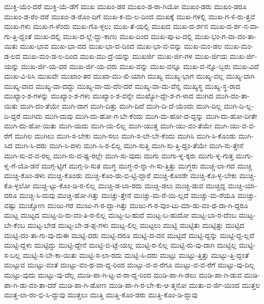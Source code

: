 {ಮುಕ್ತಿ-ಯೆಂ-ದರೆ
ಮುಕ್ತಿ-ಯೆ-ಡೆಗೆ
ಮುಖ
ಮುಖಂ-ಡರ
ಮುಖಂ-ಡ-ರಾ-ಗಿಯೋ
ಮುಖಂ-ಡರು
ಮುಖಂ-ಡರೂ
ಮುಖಂ-ಡ-ರೆಂ-ದರೆ
ಮುಖಂ-ಡ-ರೊಂ-ದಿಗೆ
ಮುಖ-ಕ-ಮ-ಲ-ದಿಂದ
ಮುಖಕ್ಕೆ
ಮುಖ-ಗಳಲ್ಲಿ
ಮುಖ-ಗ-ಳಿ-ರು-ತ್ತವೆ
ಮುಖ-ಗಳು
ಮುಖ-ಗ-ಳೆಂದು
ಮುಖ-ಗೊ-ಳ್ಳಲು
ಮುಖ-ತೆ-ಯಲ್ಲಿ
ಮುಖದ
ಮುಖ-ದ-ರ್ಶನ
ಮುಖ-ದ-ರ್ಶ-ನ-ವಾ-ಗು-ತ್ತಿ-ದ್ದಂತೆ
ಮುಖ-ದಲ್ಲಿ
ಮುಖ-ದ-ಲ್ಲೆ-ದ್ದು-ಕಾಣು
ಮುಖ-ದಿಂದ
ಮುಖ-ಪು-ಟ-ದಲ್ಲಿ
ಮುಖ-ಭಂ-ಗ-ವಾ-ದಂ-ತಾ-ಯಿತು
ಮುಖ-ಭಾವ
ಮುಖ-ಭಾ-ವದ
ಮುಖ-ಭಾ-ವ-ದಿಂದ
ಮುಖ-ಭಾ-ವ-ವನ್ನು
ಮುಖ-ಮಂ-ಡಲ
ಮುಖ-ಮಂ-ಡ-ಲದ
ಮುಖ-ಮಂ-ಡ-ಲ-ದಿಂದ
ಮುಖ-ಮು-ದ್ರೆ-ಯನ್ನು
ಮುಖರ್ಜಿ
ಮುಖ-ರ್ಜಿ-ಗಳ
ಮುಖ-ರ್ಜಿಯ
ಮುಖ-ರ್ಜಿ-ಯನ್ನು
ಮುಖ-ರ್ಜಿ-ಯ-ವರ
ಮುಖ-ರ್ಜಿ-ಯ-ವರು
ಮುಖ-ವನ್ನು
ಮುಖ-ವನ್ನೂ
ಮುಖ-ವ-ನ್ನೊ-ಬ್ಬರು
ಮುಖ-ವಿದೆ
ಮುಖ-ವಿ-ರಿಸಿ
ಮುಖವೇ
ಮುಖಾಂ-ತರ
ಮುಖಾ-ಮು-ಖಿ-ಯಾಗಿ
ಮುಖ್ಯ
ಮುಖ್ಯ-ಭಾಗ
ಮುಖ್ಯ-ವಲ್ಲ
ಮುಖ್ಯ-ವಾಗಿ
ಮುಖ್ಯ-ವಾದ
ಮುಖ್ಯ-ವಾ-ದದ್ದು
ಮುಖ್ಯ-ವಾ-ದು-ದೆಂ-ದರೆ
ಮುಖ್ಯ-ವಾ-ದು-ವೆನ್ನ
ಮುಖ್ಯಸ್ಥ
ಮುಖ್ಯ-ಸ್ಥ-ರಾದ
ಮುಖ್ಯಾಂ-ಶ-ಗಳನ್ನು
ಮುಖ್ಯಾಂ-ಶ-ಗಳು
ಮುಖ್ಯಾಂ-ಶ-ವನ್ನೇ
ಮುಖ್ಯೋ-ದ್ದೇ-ಶ-ಗ-ಳಾದ
ಮುಗಿದ
ಮುಗಿ-ದಂ-ತಾ-ಯಿತು
ಮುಗಿ-ದಂ-ತೆಯೇ
ಮುಗಿ-ದಾಗ
ಮುಗಿ-ದಿತ್ತು
ಮುಗಿ-ದಿದೆ
ಮುಗಿ-ದಿ-ದೆ-ಯೆಂದು
ಮುಗಿ-ದಿಲ್ಲ
ಮುಗಿ-ದಿ-ಲ್ಲ-ದಿ-ದ್ದರೆ
ಮುಗಿದು
ಮುಗಿ-ದುವು
ಮುಗಿ-ದು-ಹೋ-ಗ-ಬೇ-ಕೆಂದು
ಮುಗಿ-ದು-ಹೋ-ದ-ದ್ದನ್ನು
ಮುಗಿ-ದು-ಹೋ-ದೀತೇ
ಮುಗಿ-ದು-ಹೋ-ಯಿತು
ಮುಗಿ-ಯದು
ಮುಗಿ-ಯ-ಲಿಲ್ಲ
ಮುಗಿ-ಯುತ್ತ
ಮುಗಿ-ಯು-ವಂ-ತೆಯೇ
ಮುಗಿ-ಯು-ವ-ವ-ರೆಗೆ
ಮುಗಿಲ
ಮುಗಿಲು
ಮುಗಿ-ಸ-ಬೇಕು
ಮುಗಿ-ಸಲು
ಮುಗಿ-ಸ-ಲೇ-ಬೇ-ಕೆಂದು
ಮುಗಿಸಿ
ಮುಗಿ-ಸಿ-ಕೊಂಡು
ಮುಗಿ-ಸಿದ
ಮುಗಿ-ಸಿ-ದರು
ಮುಗಿ-ಸಿ-ದಳು
ಮುಗಿ-ಸಿ-ರ-ಲಿಲ್ಲ
ಮುಗಿ-ಸುತ್ತಿ
ಮುಗಿ-ಸು-ತ್ತಿ-ದ್ದಂ-ತೆಯೇ
ಮುಗಿ-ಸು-ತ್ತೇನೆ
ಮುಗಿ-ಸು-ವ-ವ-ರಲ್ಲ
ಮುಗಿ-ಸು-ವ-ಷ್ಟ-ರಲ್ಲೇ
ಮುಗಿ-ಸು-ವುದು
ಮುಗು
ಮುಗು-ಳ್ನ-ಕ್ಕರು
ಮುಗು-ಳ್ನ-ಗುತ್ತ
ಮುಗು-ಳ್ನ-ಗೆ-ಯೊ-ಡನೆ
ಮುಗ್ಗ-ಟ್ಟಿಗೆ
ಮುಗ್ಗ-ರಿ-ಸುತ
ಮುಗ್ಧ
ಮುಗ್ಧ-ರ-ನ್ನಾ-ಗಿ-ಸು-ತ್ತಿತ್ತು
ಮುಗ್ಧರು
ಮುಚ್ಚ-ಲಾ-ಗದ
ಮುಚ್ಚಿ
ಮುಚ್ಚಿ-ಕೊಂ-ಡಳು
ಮುಚ್ಚಿ-ಕೊಂಡು
ಮುಚ್ಚಿ-ಕೊಂ-ಡು-ಬಿ-ಟ್ಟಿ-ದ್ದಾರೆ
ಮುಚ್ಚಿ-ಕೊಂಡೇ
ಮುಚ್ಚಿ-ಕೊ-ಳ್ಳ-ಬೇಕು
ಮುಚ್ಚಿ-ಕೊ-ಳ್ಳಲೋ
ಮುಚ್ಚಿ-ಟ್ಟು-ಕೊಂ-ಡಿ-ರ-ಲಿಲ್ಲ
ಮುಚ್ಚಿ-ಡ-ಬಾ-ರದು
ಮುಚ್ಚಿ-ಡಲು
ಮುಚ್ಚಿ-ಡುವ
ಮುಚ್ಚಿದ್ದ
ಮುಚ್ಚಿ-ಯಾ-ದರೂ
ಮುಚ್ಚಿ-ಸಿ-ದುವು
ಮುಚ್ಚಿ-ಹೋ-ಗಿತ್ತು
ಮುಚ್ಚು-ತ್ತೇನೆ
ಮುಚ್ಚು-ಮ-ರೆ-ಯಿ-ಲ್ಲದೆ
ಮುಚ್ಚು-ಮ-ರೆಯೂ
ಮುಚ್ಚು-ವಷ್ಟು
ಮುಚ್ಚೋಣ
ಮುಜು-ಗರ
ಮುಜು-ಗ-ರ-ದ್ದಾ-ಗಿತ್ತು
ಮುಜು-ಗ-ರ-ವುಂ-ಟು-ಮಾ-ಡು-ವಂ-ಥ-ದಾ-ಗಿ-ದ್ದರೂ
ಮುಟ್ಟ
ಮುಟ್ಟದ
ಮುಟ್ಟ-ದಿ-ರು-ವಂ-ತಿ-ರ-ಲಿಲ್ಲ
ಮುಟ್ಟ-ಬ-ಹುದೆ
ಮುಟ್ಟ-ಬ-ಹುದೋ
ಮುಟ್ಟ-ಬಾ-ರ-ದೆಂಬ
ಮುಟ್ಟ-ಬೇ-ಕೆಂಬ
ಮುಟ್ಟ-ಬೇಡ
ಮುಟ್ಟ-ಬೇ-ಡ-ಪ್ಪ-ಗಳು
ಮುಟ್ಟ-ಲಿಲ್ಲ
ಮುಟ್ಟಲು
ಮುಟ್ಟಿ
ಮುಟ್ಟಿತು
ಮುಟ್ಟಿತ್ತು
ಮುಟ್ಟಿದ
ಮುಟ್ಟಿ-ದಂ-ತಾ-ಗು-ವು-ದುಈ
ಮುಟ್ಟಿ-ದರು
ಮುಟ್ಟಿ-ದರೂ
ಮುಟ್ಟಿ-ದ-ವನ
ಮುಟ್ಟಿದೆ
ಮುಟ್ಟಿ-ದ್ದನ್ನು
ಮುಟ್ಟಿ-ದ್ದ-ಲ್ಲದೆ
ಮುಟ್ಟಿ-ದ್ದಳು
ಮುಟ್ಟಿದ್ದು
ಮುಟ್ಟಿ-ದ್ದೇನೆ
ಮುಟ್ಟಿ-ಬಿ-ಟ್ಟೆ-ಯಲ್ಲ
ಮುಟ್ಟಿ-ರ-ಲಿಲ್ಲ
ಮುಟ್ಟಿ-ರು-ವು-ದಾಗಿ
ಮುಟ್ಟಿಲ್ಲ
ಮುಟ್ಟಿ-ಸ-ಬಲ್ಲ
ಮುಟ್ಟಿ-ಸ-ಬೇ-ಕಾ-ಯಿತು
ಮುಟ್ಟಿ-ಸ-ಲಾ-ರದು
ಮುಟ್ಟಿ-ಸಿ-ದರು
ಮುಟ್ಟು
ಮುಟ್ಟು-ತ್ತಿತ್ತು
ಮುಟ್ಟು-ತ್ತಿ-ದ್ದಂತೆ
ಮುಟ್ಟುವ
ಮುಟ್ಟು-ವಂತೆ
ಮುಟ್ಟು-ವಂ-ಥ-ವಾ-ದ್ದ-ರಿಂದ
ಮುಟ್ಟು-ವ-ವ-ರೆಗೂ
ಮುಟ್ಟು-ವ-ವ-ರೆಗೆ
ಮುಟ್ಟು-ವು-ದಿಲ್ಲ
ಮುಟ್ಟು-ವುದು
ಮುಟ್ಟು-ವು-ದೆಲ್ಲ
ಮುಡಿ-ಪಾ-ಗಿ-ಟ್ಟ-ವ-ರಾ-ದ್ದ-ರಿಂದ
ಮುಡಿ-ಪಾ-ಗಿ-ಡಲು
ಮುಡಿ-ಪಾ-ಗಿ-ಡುವ
ಮುಡಿ-ಪಾ-ಗಿ-ಡು-ವಂ-ತಾ-ದರೆ
ಮುಡಿ-ಪಾ-ಗಿ-ಡೋಣ
ಮುಡಿ-ಪಾ-ಗಿ-ರ-ಬೇ-ಕು-ಆ-ತ್ಮನೋ
ಮುತು-ವ-ರ್ಜಿ-ಯಿಂದ
ಮುತ್ತಲ
ಮುತ್ತ-ಲಾ-ರಂ-ಭಿ-ಸಿ-ದ್ದುವು
ಮುತ್ತಲು
ಮುತ್ತಿ
ಮುತ್ತಿ-ಕೊಂ-ಡರು
ಮುತ್ತಿ-ಕೊಂ-ಡಿ-ದ್ದುವು
}
